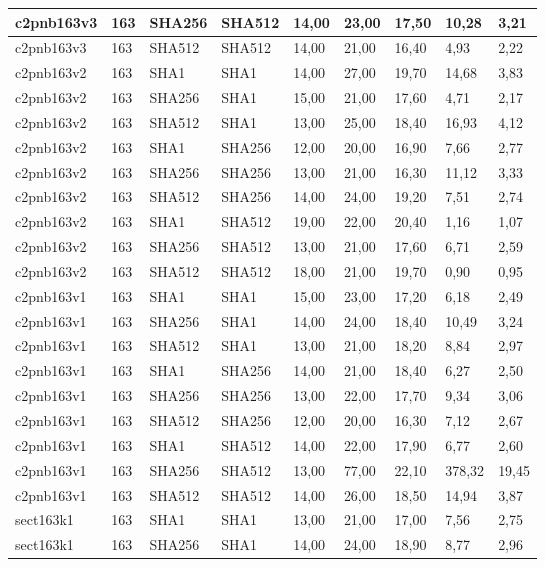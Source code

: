 \begin{longtable}{| l | l | l | l | l |l |l |l |l |}
c2pnb163v3 & 163 & SHA256 & SHA512 & 14,00 & 23,00 & 17,50 & 10,28 & 3,21 \\ \hline 
c2pnb163v3 & 163 & SHA512 & SHA512 & 14,00 & 21,00 & 16,40 & 4,93 & 2,22 \\ \hline 
c2pnb163v2 & 163 & SHA1 & SHA1 & 14,00 & 27,00 & 19,70 & 14,68 & 3,83 \\ \hline 
c2pnb163v2 & 163 & SHA256 & SHA1 & 15,00 & 21,00 & 17,60 & 4,71 & 2,17 \\ \hline 
c2pnb163v2 & 163 & SHA512 & SHA1 & 13,00 & 25,00 & 18,40 & 16,93 & 4,12 \\ \hline 
c2pnb163v2 & 163 & SHA1 & SHA256 & 12,00 & 20,00 & 16,90 & 7,66 & 2,77 \\ \hline 
c2pnb163v2 & 163 & SHA256 & SHA256 & 13,00 & 21,00 & 16,30 & 11,12 & 3,33 \\ \hline 
c2pnb163v2 & 163 & SHA512 & SHA256 & 14,00 & 24,00 & 19,20 & 7,51 & 2,74 \\ \hline 
c2pnb163v2 & 163 & SHA1 & SHA512 & 19,00 & 22,00 & 20,40 & 1,16 & 1,07 \\ \hline 
c2pnb163v2 & 163 & SHA256 & SHA512 & 13,00 & 21,00 & 17,60 & 6,71 & 2,59 \\ \hline 
c2pnb163v2 & 163 & SHA512 & SHA512 & 18,00 & 21,00 & 19,70 & 0,90 & 0,95 \\ \hline 
c2pnb163v1 & 163 & SHA1 & SHA1 & 15,00 & 23,00 & 17,20 & 6,18 & 2,49 \\ \hline 
c2pnb163v1 & 163 & SHA256 & SHA1 & 14,00 & 24,00 & 18,40 & 10,49 & 3,24 \\ \hline 
c2pnb163v1 & 163 & SHA512 & SHA1 & 13,00 & 21,00 & 18,20 & 8,84 & 2,97 \\ \hline 
c2pnb163v1 & 163 & SHA1 & SHA256 & 14,00 & 21,00 & 18,40 & 6,27 & 2,50 \\ \hline 
c2pnb163v1 & 163 & SHA256 & SHA256 & 13,00 & 22,00 & 17,70 & 9,34 & 3,06 \\ \hline 
c2pnb163v1 & 163 & SHA512 & SHA256 & 12,00 & 20,00 & 16,30 & 7,12 & 2,67 \\ \hline 
c2pnb163v1 & 163 & SHA1 & SHA512 & 14,00 & 22,00 & 17,90 & 6,77 & 2,60 \\ \hline 
c2pnb163v1 & 163 & SHA256 & SHA512 & 13,00 & 77,00 & 22,10 & 378,32 & 19,45 \\ \hline 
c2pnb163v1 & 163 & SHA512 & SHA512 & 14,00 & 26,00 & 18,50 & 14,94 & 3,87 \\ \hline 
sect163k1 & 163 & SHA1 & SHA1 & 13,00 & 21,00 & 17,00 & 7,56 & 2,75 \\ \hline 
sect163k1 & 163 & SHA256 & SHA1 & 14,00 & 24,00 & 18,90 & 8,77 & 2,96 \\ \hline 

\end{longtable}
